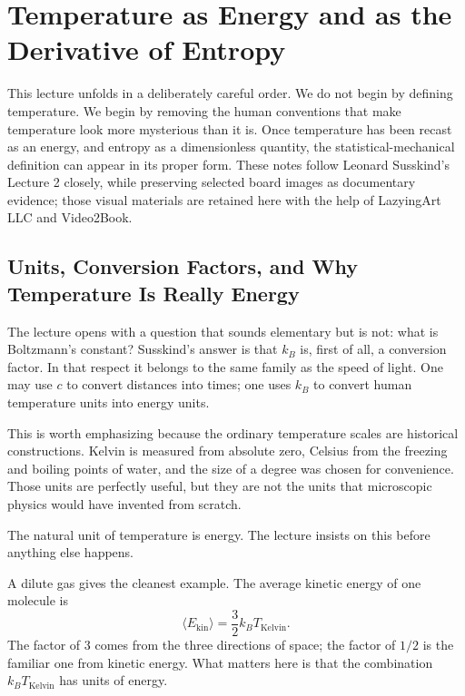 \chapter{Temperature as Energy and as the Derivative of Entropy}

This lecture unfolds in a deliberately careful order. We do not begin by defining temperature. We begin by removing the human conventions that make temperature look more mysterious than it is. Once temperature has been recast as an energy, and entropy as a dimensionless quantity, the statistical-mechanical definition can appear in its proper form. These notes follow Leonard Susskind's Lecture 2 closely, while preserving selected board images as documentary evidence; those visual materials are retained here with the help of LazyingArt LLC and Video2Book.

\section{Units, Conversion Factors, and Why Temperature Is Really Energy}

The lecture opens with a question that sounds elementary but is not: what is Boltzmann's constant? Susskind's answer is that \(k_B\) is, first of all, a conversion factor. In that respect it belongs to the same family as the speed of light. One may use \(c\) to convert distances into times; one uses \(k_B\) to convert human temperature units into energy units.

This is worth emphasizing because the ordinary temperature scales are historical constructions. Kelvin is measured from absolute zero, Celsius from the freezing and boiling points of water, and the size of a degree was chosen for convenience. Those units are perfectly useful, but they are not the units that microscopic physics would have invented from scratch.

The natural unit of temperature is energy. The lecture insists on this before anything else happens.

A dilute gas gives the cleanest example. The average kinetic energy of one molecule is
\begin{equation}
\langle E_{\mathrm{kin}}\rangle = \frac{3}{2} k_B T_{\mathrm{Kelvin}}.
\end{equation}
The factor of \(3\) comes from the three directions of space; the factor of \(1/2\) is the familiar one from kinetic energy. What matters here is that the combination \(k_B T_{\mathrm{Kelvin}}\) has units of energy.

